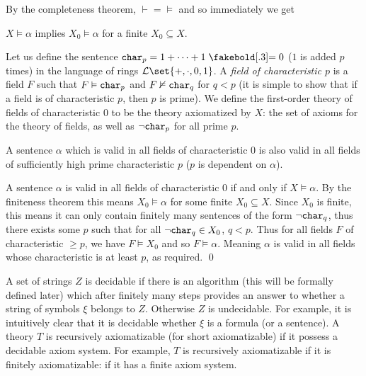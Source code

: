 By the completeness theorem, ${\vdash}={\vDash}$ and so immediately we get

\bthrm[title=The Finiteness Theorem, name=finitenesstheorem]

    $X\vDash\alpha$ implies $X_0\vDash\alpha$ for a finite $X_0\subseteq X$.

\ethrm

Let us define the sentence ${\tt char}_p=1+\cdots+1\eq0$ ($1$ is added $p$ times) in the language of rings ${\cal L}\set{+,\cdot,0,1}$.
A {\it field of characteristic $p$} is a field $F$ such that $F\vDash{\tt char}_p$ and $F\nvDash{\tt char}_q$ for $q<p$ (it is simple to show that if a field is of characteristic $p$, then $p$ is prime).
We define the first-order theory of fields of characteristic $0$ to be the theory axiomatized by $X$: the set of axioms for the theory of fields, as well as $\neg{\tt char}_p$ for all prime $p$.

\bprop

    A sentence $\alpha$ which is valid in all fields of characteristic $0$ is also valid in all fields of sufficiently high prime characteristic $p$ ($p$ is dependent on $\alpha$).

\eprop

A sentence $\alpha$ is valid in all fields of characteristic $0$ if and only if $X\vDash\alpha$.
By the finiteness theorem this means $X_0\vDash\alpha$ for some finite $X_0\subseteq X$.
Since $X_0$ is finite, this means it can only contain finitely many sentences of the form $\neg{\tt char}_q$, thus there exists some $p$ such that for all $\neg{\tt char}_q\in X_0$, $q<p$.
Thus for all fields $F$ of characteristic $\geq p$, we have $F\vDash X_0$ and so $F\vDash\alpha$.
Meaning $\alpha$ is valid in all fields whose characteristic is at least $p$, as required.
\qed

\bdefn

    A set of strings $Z$ is {\emphcolor decidable} if there is an algorithm (this will be formally defined later) which after finitely many steps provides an answer to whether a 
    string of symbols $\xi$ belongs to $Z$.
    Otherwise $Z$ is {\emphcolor undecidable}.
    For example, it is intuitively clear that it is decidable whether $\xi$ is a formula (or a sentence).
    A theory $T$ is {\emphcolor recursively axiomatizable} (for short {\emphcolor axiomatizable}) if it possess a decidable axiom system.
    For example, $T$ is recursively axiomatizable if it is finitely axiomatizable: if it has a finite axiom system.

